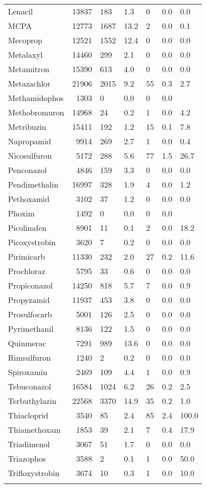 \begin{longtable}{p{2.5cm}rR{1cm}R{1cm}R{1.2cm}R{1.2cm}R{1.3cm}}
  Lenacil & 13837 & 183 & 1.3 &  0 & 0.0 & 0.0 \\ 
  MCPA & 12773 & 1687 & 13.2 &  2 & 0.0 & 0.1 \\ 
  Mecoprop & 12521 & 1552 & 12.4 &  0 & 0.0 & 0.0 \\ 
  Metalaxyl & 14460 & 299 & 2.1 &  0 & 0.0 & 0.0 \\ 
  Metamitron & 15390 & 613 & 4.0 &  0 & 0.0 & 0.0 \\ 
  Metazachlor & 21906 & 2015 & 9.2 & 55 & 0.3 & 2.7 \\ 
  Methamidophos & 1303 &  0 & 0.0 &  0 & 0.0 &  \\ 
  Methobromuron & 14968 & 24 & 0.2 &  1 & 0.0 & 4.2 \\ 
  Metribuzin & 15411 & 192 & 1.2 & 15 & 0.1 & 7.8 \\ 
  Napropamid & 9914 & 269 & 2.7 &  1 & 0.0 & 0.4 \\ 
  Nicosulfuron & 5172 & 288 & 5.6 & 77 & 1.5 & 26.7 \\ 
  Penconazol & 4846 & 159 & 3.3 &  0 & 0.0 & 0.0 \\ 
  Pendimethalin & 16997 & 328 & 1.9 &  4 & 0.0 & 1.2 \\ 
  Pethoxamid & 3102 & 37 & 1.2 &  0 & 0.0 & 0.0 \\ 
  Phoxim & 1492 &  0 & 0.0 &  0 & 0.0 &  \\ 
  Picolinafen & 8901 & 11 & 0.1 &  2 & 0.0 & 18.2 \\ 
  Picoxystrobin & 3620 &  7 & 0.2 &  0 & 0.0 & 0.0 \\ 
  Pirimicarb & 11330 & 232 & 2.0 & 27 & 0.2 & 11.6 \\ 
  Prochloraz & 5795 & 33 & 0.6 &  0 & 0.0 & 0.0 \\ 
  Propiconazol & 14250 & 818 & 5.7 &  7 & 0.0 & 0.9 \\ 
  Propyzamid & 11937 & 453 & 3.8 &  0 & 0.0 & 0.0 \\ 
  Prosulfocarb & 5001 & 126 & 2.5 &  0 & 0.0 & 0.0 \\ 
  Pyrimethanil & 8136 & 122 & 1.5 &  0 & 0.0 & 0.0 \\ 
  Quinmerac & 7291 & 989 & 13.6 &  0 & 0.0 & 0.0 \\ 
  Rimsulfuron & 1240 &  2 & 0.2 &  0 & 0.0 & 0.0 \\ 
  Spiroxamin & 2469 & 109 & 4.4 &  1 & 0.0 & 0.9 \\ 
  Tebuconazol & 16584 & 1024 & 6.2 & 26 & 0.2 & 2.5 \\ 
  Terbuthylazin & 22568 & 3370 & 14.9 & 35 & 0.2 & 1.0 \\ 
  Thiacloprid & 3540 & 85 & 2.4 & 85 & 2.4 & 100.0 \\ 
  Thiamethoxam & 1853 & 39 & 2.1 &  7 & 0.4 & 17.9 \\ 
  Triadimenol & 3067 & 51 & 1.7 &  0 & 0.0 & 0.0 \\ 
  Triazophos & 3588 &  2 & 0.1 &  1 & 0.0 & 50.0 \\ 
  Trifloxystrobin & 3674 & 10 & 0.3 &  1 & 0.0 & 10.0 \\
   \bottomrule
\label{tab:rac_dat}
\end{longtable}
